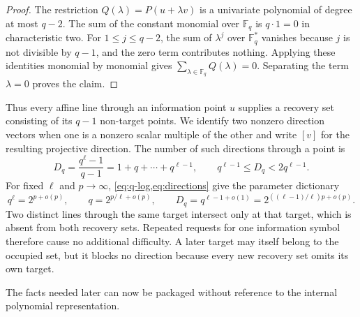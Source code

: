 \documentclass[11pt]{article}
\newcommand{\F}{\mathbb{F}}
\begin{document}
\begin{proof}
The restriction $Q(\lambda)=P(u+\lambda v)$ is a univariate polynomial of
degree at most $q-2$.  The sum of the constant monomial over $\F_q$ is
$q\cdot1=0$ in characteristic two.  For $1\le j\le q-2$, the sum of
$\lambda^j$ over $\F_q^*$ vanishes because $j$ is not divisible by $q-1$,
and the zero term contributes nothing.  Applying these identities monomial by
monomial gives
$\sum_{\lambda\in\F_q}Q(\lambda)=0$.  Separating the term $\lambda=0$ proves
the claim.
\end{proof}

Thus every affine line through an information point $u$ supplies a recovery
set consisting of its $q-1$ non-target points.  We identify two nonzero
direction vectors when one is a nonzero scalar multiple of the other and
write $[v]$ for the resulting projective direction.  The number of such
directions through a point is
\begin{equation}\label{eq:directions}
  D_q=\frac{q^\ell-1}{q-1}=1+q+\cdots+q^{\ell-1},
  \qquad
  q^{\ell-1}\le D_q<2q^{\ell-1}.
\end{equation}
For fixed $\ell$ and $p\to\infty$, \cref{eq:q-log,eq:directions} give the
parameter dictionary
\begin{equation}\label{eq:parameter-dictionary}
  q^\ell=2^{p+o(p)},
  \qquad
  q=2^{p/\ell+o(p)},
  \qquad
  D_q=q^{\ell-1+o(1)}
      =2^{((\ell-1)/\ell)p+o(p)}.
\end{equation}
Two distinct lines through the same target intersect only at that target,
which is absent from both recovery sets.  Repeated requests for one information
symbol therefore cause no additional difficulty.  A later target may itself
belong to the occupied set, but it blocks no direction because every new
recovery set omits its own target.

The facts needed later can now be packaged without reference to the internal
polynomial representation.
\end{document}
